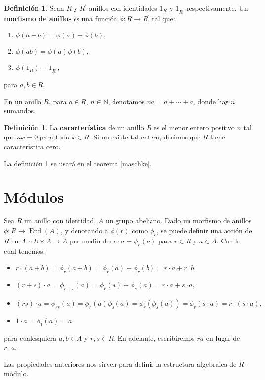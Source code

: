 \documentclass[12pt]{book}
\theoremstyle{definition}
\newtheorem{definition}[theorem]{Definición}
\DeclareMathOperator{\End}{End}
\newcounter{in}
\newcounter{ini}
\begin{document}
\begin{definition}
  Sean $R$ y $R^{'}$ anillos con identidades $1_{R}$ y $1_{R^{'}}$
  respectivamente. Un \textbf{morfismo de anillos} es una función
  $\phi:R\rightarrow R^{'}$ tal que:
  \begin{enumerate}
  \item $\phi(a+b)=\phi(a)+\phi(b),$
  \item $\phi(ab)=\phi(a)\phi(b),$
  \item $\phi(1_{R})=1_{R^{'}},$
  \end{enumerate}
para $a,b\in R$.
\end{definition}
En un anillo $R$, para $a\in R$, $n\in\mathbb{N}$, denotamos $na=a+\cdots+a$, donde hay $n$ sumandos.

\begin{definition}
  \label{caracteristica}
  La \textbf{característica} de un anillo $R$ es el menor entero positivo $n$
  tal que $nx=0$ para toda $x\in R$. Si no existe tal entero, decimos
  que $R$ tiene característica cero.
\end{definition}
La definición \ref{caracteristica} se usará en el teorema \ref{maschke}. 

\section{Módulos}
\label{modulos}

Sea $R$ un anillo con identidad, $A$ un grupo abeliano. Dado un
morfismo de anillos $\phi:R\rightarrow \End(A)$, y denotando a
$\phi(r)$ como $\phi_{r}$, se puede definir una acción de $R$ en $A$ 
$\cdot:R\times A\rightarrow A$ por medio de: $r\cdot a=\phi_{r}(a)$
para $r\in R$ y $a\in A$. Con lo cual tenemos:
\begin{itemize}
\item $r\cdot (a+b)=\phi_{r}(a+b)=\phi_{r}(a)+\phi_{r}(b)=r\cdot
  a+r\cdot b,$
\item $(r+s)\cdot a=\phi_{r+s}(a)=\phi_{r}(a)+\phi_{s}(a)=r\cdot
  a+s\cdot a,$
\item $(rs)\cdot
  a=\phi_{rs}(a)=\phi_{r}(a)\phi_{s}(a)=\phi_{r}(\phi_{s}(a))=\phi_{r}(s\cdot
  a)=r\cdot(s\cdot a),$
\item $1\cdot a=\phi_{1}(a)=a.$
\end{itemize}
para cualesquiera $a,b\in A$ y $r,s\in R$. En adelante, escribiremos
$ra$ en lugar de $r\cdot a$.

Las propiedades anteriores nos sirven para definir la estructura
algebraica de $R$-módulo. 
\end{document}
